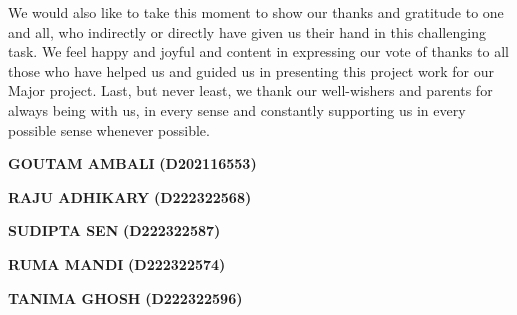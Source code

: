 \documentclass[12pt,a4paper]{report}
\begin{document}
We would also like to take this moment to show our thanks and gratitude to one and all, who indirectly or directly have given us their hand in this challenging task. We feel happy and joyful and content in expressing our vote of thanks to all those who have helped us and guided us in presenting this project work for our Major project. Last, but never least, we thank our well-wishers and parents for always being with us, in every sense and constantly supporting us in every possible sense whenever possible.



\vspace{1 cm}                        
\begin{multicols}{3}
\centering
\textbf{GOUTAM AMBALI}
\textbf{(D202116553)}\\
\vspace{1cm}


\textbf{RAJU ADHIKARY}
\textbf{(D222322568)}\\
\vspace{1cm}


\textbf{SUDIPTA SEN}
\textbf{(D222322587)}\\
\vspace{1cm}


\textbf{RUMA MANDI}
\textbf{(D222322574)}\\
\vspace{1cm}
\sloppy

\textbf{TANIMA GHOSH}
\textbf{(D222322596)}\\
\vspace{1cm}
\end{multicols}


\newpage
\tableofcontents %
\newpage
{}

\listoffigures



\newpage
% 



\newpage







\end{document}
